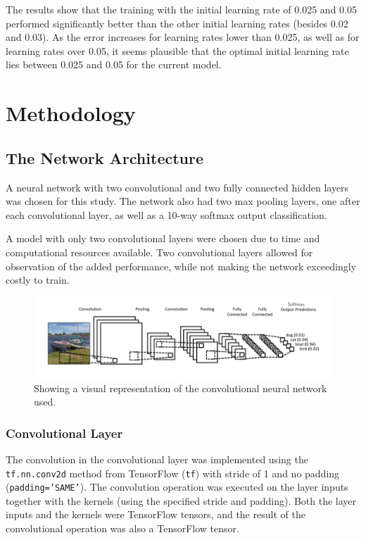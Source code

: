 \documentclass[]{article}
\begin{document}
The results show that the training with the initial learning rate of 0.025 and 0.05 performed significantly better than the other initial learning rates (besides 0.02 and 0.03). As the error increases for learning rates lower than 0.025, as well as for learning rates over 0.05, it seems plausible that the optimal initial learning rate lies between 0.025 and 0.05 for the current model. 


\section{Methodology}


\subsection{The Network Architecture}

A neural network with two convolutional and two fully connected hidden layers was chosen for this study. The network also had two max pooling layers, one after each convolutional layer, as well as a 10-way softmax output classification. 

A model with only two convolutional layers were chosen due to time and computational resources available. Two convolutional layers allowed for observation of the added performance, while not making the network exceedingly costly to train. 

\begin{figure}[h]
	\includegraphics[width=\textwidth]{conv}
	\caption{Showing a visual representation of the convolutional neural network used.}
	\label{conv}
	\centering
\end{figure}

\subsubsection{Convolutional Layer}

The convolution in the convolutional layer was implemented using the \texttt{tf.nn.conv2d} method from TensorFlow (\texttt{tf}) with stride of 1 and no padding (\texttt{padding='SAME'}). The convolution operation was executed on the layer inputs together with the kernels (using the specified stride and padding). Both the layer inputs and the kernels were TensorFlow tensors, and the result of the convolutional operation was also a TensorFlow tensor. 
\end{document}
